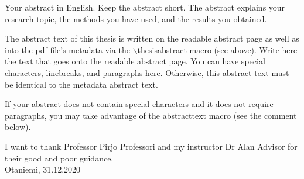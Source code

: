 \documentclass[english, 12pt, a4paper, sci, utf8, a-1b, online]{aaltothesis}
\date{31.12.2020}
\begin{document}
\makecoverpage

\makecopyrightpage


\begin{abstractpage}[english]
  Your abstract in English. Keep the abstract short. The abstract explains your
  research topic, the methods you have used, and the results you obtained.  
  
  The abstract text of this thesis is written on the readable abstract page as
  well as into the pdf file's metadata via the $\backslash$thesisabstract macro
  (see above). Write here the text that goes onto the readable abstract page.
  You can have special characters, linebreaks, and paragraphs here. Otherwise,
  this abstract text must be identical to the metadata abstract text.
  
  If your abstract does not contain special characters and it does not require
  paragraphs, you may take advantage of the abstracttext macro (see the comment
  below).
\end{abstractpage}


\newpage


I want to thank Professor Pirjo Professori and my instructor Dr Alan Advisor for 
their good and poor guidance.\\

\vspace{5cm}
Otaniemi, 31.12.2020
\end{document}
